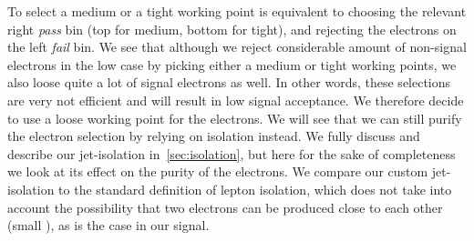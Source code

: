 To select a medium or a tight working point is equivalent to choosing the relevant right \emph{pass} bin (top for medium, bottom for tight), and rejecting the electrons on the left \emph{fail} bin. We see that although we reject considerable amount of non-signal electrons in the low \dm case by picking either a medium or tight working points, we also loose quite a lot of signal electrons as well. In other words, these selections are very not efficient and will result in low signal acceptance. We therefore decide to use a loose working point for the electrons. We will see that we can still purify the electron selection by relying on isolation instead. We fully discuss and describe our jet-isolation in~\ref{sec:isolation}, but here for the sake of completeness we look at its effect on the purity of the electrons. We compare our custom jet-isolation to the standard definition of lepton isolation, which does not take into account the possibility that two electrons can be produced close to each other (small \DR), as is the case in our signal.


